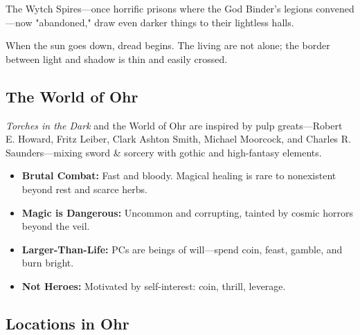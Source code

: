 \documentclass[10pt,twoside]{article}
\begin{document}
\begin{multicols}{2}
\begin{grimnote}[title={\textsc{The Wytch Spires}}]
The Wytch Spires—once horrific prisons where the God Binder's legions convened—now "abandoned," draw even darker things to their lightless halls.
\end{grimnote}

\columnbreak

\begin{warningbox}[title={\textsc{The Enemy in the Dark}}]
When the sun goes down, dread begins. The living are not alone; the border between light and shadow is thin and easily crossed.
\end{warningbox}
\end{multicols}

\subsection{The World of Ohr}

\textit{Torches in the Dark} and the World of Ohr are inspired by pulp greats—Robert E. Howard, Fritz Leiber, Clark Ashton Smith, Michael Moorcock, and Charles R. Saunders—mixing sword \& sorcery with gothic and high-fantasy elements.

\begin{multicols}{2}
\begin{itemize}
\item \textbf{Brutal Combat:} Fast and bloody. Magical healing is rare to nonexistent beyond rest and scarce herbs.
\item \textbf{Magic is Dangerous:} Uncommon and corrupting, tainted by cosmic horrors beyond the veil.
\item \textbf{Larger-Than-Life:} PCs are beings of will—spend coin, feast, gamble, and burn bright.
\item \textbf{Not Heroes:} Motivated by self-interest: coin, thrill, leverage.
\end{itemize}
\end{multicols}

\subsection{Locations in Ohr}
\end{document}
